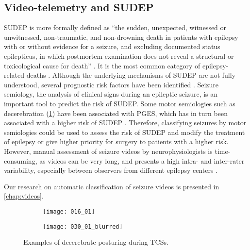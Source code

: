 \subsection{Video-telemetry and SUDEP}

\ac{SUDEP} is more formally defined as ``the sudden, unexpected, witnessed or unwitnessed, non-traumatic, and non-drowning death in patients with epilepsy with or without evidence for a seizure, and excluding documented status epilepticus, in which postmortem examination does not reveal a structural or toxicological cause for death'' \cite{nashef_sudden_1997}.
It is the most common category of epilepsy-related deaths \cite{devinsky_sudden_2016}.
Although the underlying mechanisms of \ac{SUDEP} are not fully understood, several prognostic risk factors have been identified \cite{so_what_2008, jha_sudden_2021}.
Seizure semiology, the analysis of clinical signs during an epileptic seizure, is an important tool to predict the risk of \ac{SUDEP}.
Some motor semiologies such as decerebration (\cref{fig:decerebration}) have been associated with \ac{PGES}, which has in turn been associated with a higher risk of \ac{SUDEP} \cite{alexandre_risk_2015,vilella_association_2021}.
Therefore, classifying seizures by motor semiologies could be used to assess the risk of \ac{SUDEP} and modify the treatment of epilepsy or give higher priority for surgery to patients with a higher risk.
However, manual assessment of seizure videos by neurophysiologists is time-consuming, as videos can be very long, and presents a high intra- and inter-rater variability, especially between observers from different epilepsy centers \cite{tufenkjian_seizure_2012}.

Our research on automatic classification of seizure videos is presented in \cref{chap:videos}.

\begin{figure}
  \centering

  \begin{subfigure}{0.49\linewidth}
    \texttt{[image: 016\_01]}
  \end{subfigure}
  \begin{subfigure}{0.49\linewidth}
    \texttt{[image: 030\_01\_blurred]}
  \end{subfigure}
  \caption[Examples of decerebrate posturing]{
    Examples of decerebrate posturing during \acp{TCS}.
  }
  \label{fig:decerebration}
\end{figure}

